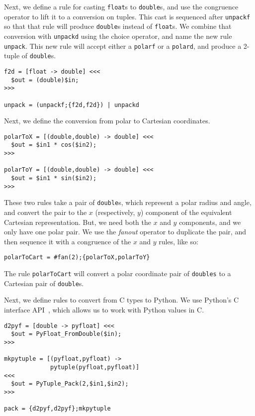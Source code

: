 Next, we define a rule for casting \texttt{float}s to
\texttt{double}s, and use the congruence operator to lift it to a
conversion on tuples. This cast is sequenced after
\texttt{unpackf} so that that rule will produce \texttt{double}s
instead of \texttt{float}s. We combine that conversion with
\texttt{unpackd} using the choice operator, and name the new rule
\texttt{unpack}. This new rule will accept either a
\texttt{polarf} or a \texttt{polard}, and produce a 2-tuple of
\texttt{double}s.

\begin{verbatim}
f2d = [float -> double] <<<
  $out = (double)$in;
>>>

unpack = (unpackf;{f2d,f2d}) | unpackd
\end{verbatim}

Next, we define the conversion from polar to Cartesian
coordinates.

\begin{verbatim}
polarToX = [(double,double) -> double] <<<
  $out = $in1 * cos($in2);  
>>>

polarToY = [(double,double) -> double] <<<
  $out = $in1 * sin($in2);
>>>
\end{verbatim}

These two rules take a pair of \texttt{double}s, which represent a
polar radius and angle, and convert the pair to the $x$
(respectively, $y$) component of the equivalent Cartesian
representation. But, we need both the $x$ and $y$ components, and
we only have one polar pair. We use the \emph{fanout} operator to
duplicate the pair, and then sequence it with a congruence of the
$x$ and $y$ rules, like so:

\begin{verbatim}
polarToCart = #fan(2);{polarToX,polarToY}
\end{verbatim}

The rule \texttt{polarToCart} will convert a polar coordinate pair
of \texttt{doubles} to a Cartesian pair of \texttt{double}s.

Next, we define rules to convert from C types to Python. We use
Python's C interface API~\cite{python-c-api}, which allows us to
work with Python values in C.

\begin{verbatim}
d2pyf = [double -> pyfloat] <<<
  $out = PyFloat_FromDouble($in);
>>>

mkpytuple = [(pyfloat,pyfloat) -> 
             pytuple(pyfloat,pyfloat)] 
<<<
  $out = PyTuple_Pack(2,$in1,$in2);
>>>

pack = {d2pyf,d2pyf};mkpytuple
\end{verbatim}

